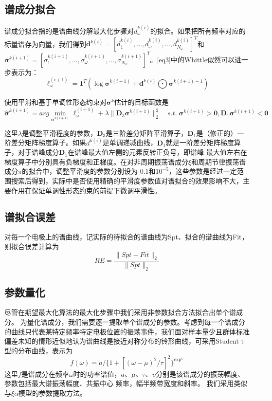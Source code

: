 \subsection{谱成分拟合}
谱成分拟合指的是谱曲线分解最大化步骤对$d_\omega^{k(i)}$的拟合。如果把所有频率对应的标量谱存为向量，我们得到$\mathbf{d}^{k(i)}=[d_1^{k(i)},...,d_\omega^{k(i)},...,d_{N_\omega}^{k(i)}]^T$和$\mathbf{\sigma}^{k(i+1)}=[\sigma_1^{k(i+1)},...,\sigma_\omega^{k(i+1)},...,\sigma_{N_\omega}^{k(i+1)}]^T$。\eqref{eq3}中的Whittle似然可以进一步表示为：
\begin{equation}\label{eq11}
\ell_\omega^{(i+1)}=\mathbf{1}^T(\log{\mathbf{\sigma}}^{k(i+1)}+\mathbf{d}^{k(i)}\bigodot{\mathbf{\sigma}^{k(i+1)-1}})
\end{equation}

使用平滑和基于单调性形态约束对$\mathbf{\sigma}^k$估计的目标函数是
\begin{equation}\label{eq12}
\hat{\mathbf{\sigma}}^{k(i+1)}=arg\min_{\mathbf{\sigma}^{k(i+1)}}\ell_\omega^{(i+1)}+\lambda\lVert\mathbf{D}_3\mathbf{\sigma}^{k(i+1)}\rVert_2^2\quad
s.t.\;\mathbf{\sigma}^{k(i+1)}>\mathbf{0},\mathbf{D}_1\mathbf{\sigma}^{k(i+1)}<\mathbf{0}
\end{equation}

这里$\lambda$是调整平滑程度的参数，$\mathbf{D}_3$是三阶差分矩阵平滑算子，$\mathbf{D}_1$是（修正的）一阶差分矩阵梯度算子。如果$d^{k(i)}$是单调递减曲线，$\mathbf{D}_1$就是一阶差分矩阵梯度算子，对于谱峰成分$\mathbf{D}_1$在谱峰最大值左侧的元素反转正负号，即谱峰
最大值左右在梯度算子中分别具有负梯度和正梯度。在对非周期振荡谱成分$\xi$和周期节律振荡谱成分$\pi$的拟合中，调整平滑度的参数分别设为
0.1和$10^{-5}$，这些参数是经过一定范围搜索后得到，实际中是否使用精确的平滑度参数值对谱拟合的效果影响不大，主要作用在保证单调性形态约束的前提下微调平滑性。

\subsection{谱拟合误差}
对每一个电极上的谱曲线，记实际的待拟合的谱曲线为Spt、拟合的谱曲线为Fit，则拟合误差计算为
\begin{equation}\label{eq13}
RE = \frac{\lVert{Spt-Fit}\rVert_2}{\lVert{Spt}\rVert_2}
\end{equation}

\subsection{参数量化}
尽管在期望最大化算法的最大化步骤中我们采用非参数拟合方法拟合出单个谱成分。 为量化谱成分，我们需要逐一提取单个谱成分的参数。考虑到每一个谱成分的曲线只代表某特定频率特定电极位置的振荡事件，我们面对样本量少且群体标准偏差未知的情形近似地认为谱曲线是接近对称分布的铃形曲线，可采用Student t型的分布曲线，表示为
\begin{equation}\label{eq14}
f(\omega)=a/\lbrace1+[(\omega-\mu)^2/\tau]^2\rbrace^{\exp^\upsilon}
\end{equation}
这里$f$是谱成分在频率$\omega$时的功率谱值，$a$、$\mu$、$\tau$、$\upsilon$分别是该谱成分的振荡幅度、参数包括最大谱振荡幅度、共振中心
频率，幅半频带宽度和斜率。 我们采用类似与$\xi\alpha$模型的参数提取方法。

